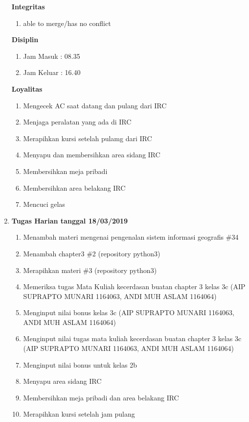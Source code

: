 \begin{enumerate}
\textbf{Integritas}
\begin{enumerate}
\item able to merge/has no conflict
\end{enumerate}

\textbf{Disiplin}
\begin{enumerate}
\item Jam Masuk : 08.35
\item Jam Keluar : 16.40
\end{enumerate}

\textbf{Loyalitas}
\begin{enumerate}
\item Mengecek AC saat datang dan pulang dari IRC
\item Menjaga peralatan yang ada di IRC
\item Merapihkan kursi setelah pulamg dari IRC
\item Menyapu dan membersihkan area sidang IRC
\item Membersihkan meja pribadi
\item Membersihkan area belakang IRC
\item Mencuci gelas
\end{enumerate}

\item \textbf{Tugas Harian tanggal 18/03/2019}
\begin{enumerate}
\item Menambah materi mengenai pengenalan sistem informasi geografis \#34
\item Menambah chapter3 \#2 (repository python3)
\item Merapihkan materi \#3 (repository python3)
\item Memeriksa tugas Mata Kuliah kecerdasan buatan chapter 3 kelas 3c (AIP SUPRAPTO MUNARI 1164063, ANDI MUH ASLAM 1164064)
\item Menginput nilai bonus kelas 3c (AIP SUPRAPTO MUNARI 1164063, ANDI MUH ASLAM 1164064)
\item Menginput nilai tugas mata kuliah kecerdasan buatan chapter 3 kelas 3c (AIP SUPRAPTO MUNARI 1164063, ANDI MUH ASLAM 1164064)
\item Menginput nilai bonus untuk kelas 2b
\item Menyapu area sidang IRC
\item Membersihkan meja pribadi dan area belakang IRC
\item Merapihkan kursi setelah jam pulang 
\end{enumerate}


\end{enumerate}
